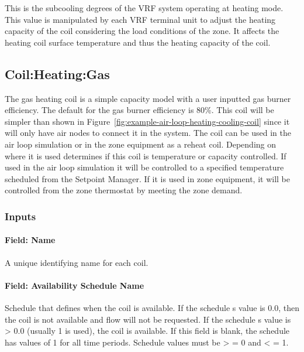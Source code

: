This is the subcooling degrees of the VRF system operating at heating mode. This value is manipulated by each VRF terminal unit to adjust the heating capacity of the coil considering the load conditions of the zone. It affects the heating coil surface temperature and thus the heating capacity of the coil.

\subsection{Coil:Heating:Gas}\label{coilheatinggas-000}

The gas heating coil is a simple capacity model with a user inputted gas burner efficiency. The default for the gas burner efficiency is 80\%. This coil will be simpler than shown in Figure~\ref{fig:example-air-loop-heating-cooling-coil} since it will only have air nodes to connect it in the system. The coil can be used in the air loop simulation or in the zone equipment as a reheat coil. Depending on where it is used determines if this coil is temperature or capacity controlled. If used in the air loop simulation it will be controlled to a specified temperature scheduled from the Setpoint Manager. If it is used in zone equipment, it will be controlled from the zone thermostat by meeting the zone demand.

\subsubsection{Inputs}\label{inputs-10-006}

\paragraph{Field: Name}\label{field-name-9-006}

A unique identifying name for each coil.

\paragraph{Field: Availability Schedule Name}\label{field-availability-schedule-name-4-003}

Schedule that defines when the coil is available. If the schedule s value is 0.0, then the coil is not available and flow will not be requested. If the schedule s value is \textgreater{} 0.0 (usually 1 is used), the coil is available. If this field is blank, the schedule has values of 1 for all time periods. Schedule values must be \textgreater{} = 0 and \textless{} = 1.

